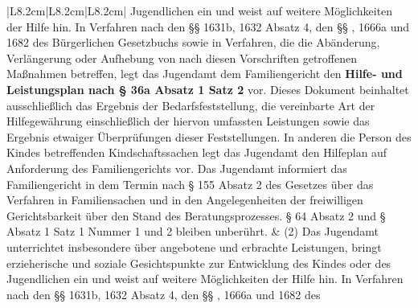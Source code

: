 \documentclass[10pt,a4paper,landscape]{article}
\begin{document}
\begin{longtable}{|L{8.2cm}|L{8.2cm}|L{8.2cm}|}
\newline Jugendlichen ein und weist auf weitere  \newline Möglichkeiten der Hilfe hin. In Verfahren  \newline nach den \S{}\S{} 1631b, 1632 Absatz 4, den \S{}\S{}  , 1666a und 1682 des Bürgerlichen  \newline Gesetzbuchs sowie in Verfahren, die die  \newline Abänderung, Verlängerung oder  \newline Aufhebung von nach diesen Vorschriften  \newline getroffenen Maßnahmen betreffen, legt das  \newline Jugendamt dem Familiengericht den \textbf{Hilfe-  \newline und Leistungsplan nach \S{} 36a Absatz 1  \newline Satz 2} vor. Dieses Dokument beinhaltet  \newline ausschließlich das Ergebnis der  \newline Bedarfsfeststellung, die vereinbarte Art der  \newline Hilfegewährung einschließlich der hiervon  \newline umfassten Leistungen sowie das Ergebnis  \newline etwaiger Überprüfungen dieser  \newline Feststellungen. In anderen die Person des  \newline Kindes betreffenden Kindschaftssachen  \newline legt das Jugendamt den Hilfeplan auf  \newline Anforderung des Familiengerichts vor. Das  \newline Jugendamt informiert das Familiengericht  \newline in dem Termin nach \S{} 155 Absatz 2 des  \newline Gesetzes über das Verfahren in  \newline Familiensachen und in den  \newline Angelegenheiten der freiwilligen  \newline Gerichtsbarkeit über den Stand des  \newline Beratungsprozesses. \S{} 64 Absatz 2 und \S{}   Absatz 1 Satz 1 Nummer 1 und 2  \newline bleiben unberührt. & (2) Das Jugendamt unterrichtet  \newline insbesondere über angebotene und  \newline erbrachte Leistungen, bringt erzieherische  \newline und soziale Gesichtspunkte zur  \newline Entwicklung des Kindes oder des  \newline Jugendlichen ein und weist auf weitere  \newline Möglichkeiten der Hilfe hin. In Verfahren  \newline nach den \S{}\S{} 1631b, 1632 Absatz 4, den \S{}\S{}  , 1666a und 1682 des 
\end{longtable}
\end{document}
